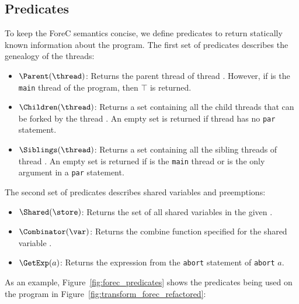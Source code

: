 
\subsection{Predicates}
To keep the ForeC semantics concise, we define predicates to return
statically known information about the program. The first set of
predicates describes the genealogy of the threads:
\begin{itemize}
	\item $\Parent(\thread)$:
		Returns the parent thread of thread \thread{}.
		However, if \thread{} is the \verb$main$ thread of the
		program, then $\top$ is returned.
	\item $\Children(\thread)$:
		Returns a set containing all the child threads that can be forked by the 
		thread \thread{}. An empty set is returned if thread 
		\thread{} has no \verb$par$ statement.
	\item $\Siblings(\thread)$:
		Returns a set containing all the sibling threads of thread \thread{}.
		An empty set is returned if \thread{} is the \verb$main$ thread
		or is the only argument in a \verb$par$ statement.
\end{itemize}
The second set of predicates describes shared variables and preemptions:
\begin{itemize}
	\item $\Shared(\store)$:
		Returns the set of all shared variables in the given \store{}.
	\item $\Combinator(\var)$:
		Returns the combine function specified for the shared variable \var{}.
	\item $\GetExp(a)$:
		Returns the expression \expression{} from the \verb$abort$ statement of \verb$abort$ $a$.
\end{itemize}
As an example, Figure~\ref{fig:forec_predicates} shows the predicates being used on
the program in Figure~\ref{fig:transform_forec_refactored}:
